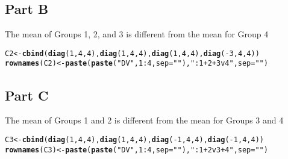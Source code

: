 \documentclass{article}\usepackage[]{graphicx}\usepackage[]{color}
\makeatletter
\newcommand{\hlnum}[1]{\textcolor[rgb]{0.686,0.059,0.569}{#1}}%
\newcommand{\hlstr}[1]{\textcolor[rgb]{0.192,0.494,0.8}{#1}}%
\newcommand{\hlopt}[1]{\textcolor[rgb]{0,0,0}{#1}}%
\newcommand{\hlstd}[1]{\textcolor[rgb]{0.345,0.345,0.345}{#1}}%
\newcommand{\hlkwb}[1]{\textcolor[rgb]{0.69,0.353,0.396}{#1}}%
\newcommand{\hlkwc}[1]{\textcolor[rgb]{0.333,0.667,0.333}{#1}}%
\newcommand{\hlkwd}[1]{\textcolor[rgb]{0.737,0.353,0.396}{\textbf{#1}}}%
\newenvironment{kframe}{%
 \def\at@end@of@kframe{}%
 \ifinner\ifhmode%
  \def\at@end@of@kframe{\end{minipage}}%
  \begin{minipage}{\columnwidth}%
 \fi\fi%
 \def\FrameCommand##1{\hskip\@totalleftmargin \hskip-\fboxsep
 \colorbox{shadecolor}{##1}\hskip-\fboxsep
     \hskip-\linewidth \hskip-\@totalleftmargin \hskip\columnwidth}%
 \MakeFramed {\advance\hsize-\width
   \@totalleftmargin\z@ \linewidth\hsize
   \@setminipage}}%
 {\par\unskip\endMakeFramed%
 \at@end@of@kframe}
\newenvironment{knitrout}{}{} %
\makeatother
\begin{document}
\subsection{Part B}
The mean of Groups 1, 2, and 3 is different from the mean for Group 4
\begin{knitrout}
\color{fgcolor}\begin{kframe}
\begin{alltt}
\hlstd{C2} \hlkwb{<-} \hlkwd{cbind}\hlstd{(}\hlkwd{diag}\hlstd{(}\hlnum{1}\hlstd{,} \hlnum{4}\hlstd{,} \hlnum{4}\hlstd{),} \hlkwd{diag}\hlstd{(}\hlnum{1}\hlstd{,} \hlnum{4}\hlstd{,} \hlnum{4}\hlstd{),} \hlkwd{diag}\hlstd{(}\hlnum{1}\hlstd{,} \hlnum{4}\hlstd{,} \hlnum{4}\hlstd{),} \hlkwd{diag}\hlstd{(}\hlopt{-}\hlnum{3}\hlstd{,}\hlnum{4}\hlstd{,}\hlnum{4}\hlstd{))}
\hlkwd{rownames}\hlstd{(C2)} \hlkwb{<-} \hlkwd{paste}\hlstd{(}\hlkwd{paste}\hlstd{(}\hlstr{"DV"}\hlstd{,} \hlnum{1}\hlopt{:}\hlnum{4}\hlstd{,} \hlkwc{sep} \hlstd{=} \hlstr{""}\hlstd{),} \hlstr{": 1+2+3 v 4"}\hlstd{,} \hlkwc{sep} \hlstd{=} \hlstr{""}\hlstd{)}
\end{alltt}
\end{kframe}
\end{knitrout}


\subsection{Part C}
The mean of Groups 1 and 2 is different from the mean for Groups 3 and 4
\begin{knitrout}
\color{fgcolor}\begin{kframe}
\begin{alltt}
\hlstd{C3} \hlkwb{<-} \hlkwd{cbind}\hlstd{(}\hlkwd{diag}\hlstd{(}\hlnum{1}\hlstd{,} \hlnum{4}\hlstd{,} \hlnum{4}\hlstd{),} \hlkwd{diag}\hlstd{(}\hlnum{1}\hlstd{,} \hlnum{4}\hlstd{,} \hlnum{4}\hlstd{),} \hlkwd{diag}\hlstd{(}\hlopt{-}\hlnum{1}\hlstd{,} \hlnum{4}\hlstd{,} \hlnum{4}\hlstd{),} \hlkwd{diag}\hlstd{(}\hlopt{-}\hlnum{1}\hlstd{,}\hlnum{4}\hlstd{,}\hlnum{4}\hlstd{))}
\hlkwd{rownames}\hlstd{(C3)} \hlkwb{<-} \hlkwd{paste}\hlstd{(}\hlkwd{paste}\hlstd{(}\hlstr{"DV"}\hlstd{,} \hlnum{1}\hlopt{:}\hlnum{4}\hlstd{,} \hlkwc{sep} \hlstd{=} \hlstr{""}\hlstd{),} \hlstr{": 1+2 v 3+4"}\hlstd{,} \hlkwc{sep} \hlstd{=} \hlstr{""}\hlstd{)}
\end{alltt}
\end{kframe}
\end{knitrout}
\end{document}
